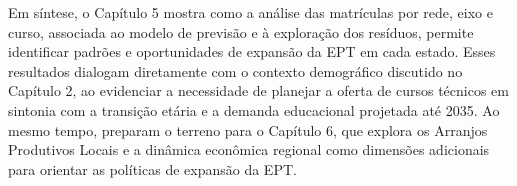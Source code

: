Em síntese, o Capítulo 5 mostra como a análise das matrículas por rede, eixo e curso, associada ao modelo de previsão e à exploração dos resíduos, permite identificar padrões e oportunidades de expansão da EPT em cada estado. Esses resultados dialogam diretamente com o contexto demográfico discutido no Capítulo 2, ao evidenciar a necessidade de planejar a oferta de cursos técnicos em sintonia com a transição etária e a demanda educacional projetada até 2035. Ao mesmo tempo, preparam o terreno para o Capítulo 6, que explora os Arranjos Produtivos Locais e a dinâmica econômica regional como dimensões adicionais para orientar as políticas de expansão da EPT.
